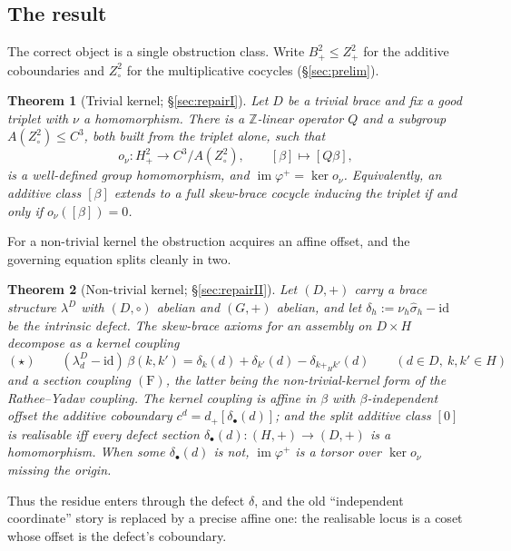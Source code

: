 \documentclass[11pt,reqno]{amsart}
\theoremstyle{plain}
\newtheorem{theorem}{Theorem}[section]
\theoremstyle{definition}
\newcommand{\Z}{\mathbb{Z}}
\newcommand{\id}{\mathrm{id}}
\newcommand{\im}{\operatorname{im}}
\newcommand{\shat}{\widehat{\sigma}}
\newcommand{\lD}{\lambda^{D}}
\begin{document}
\subsection*{The result}
The correct object is a single obstruction class. Write $B^2_+\le Z^2_+$ for the additive
coboundaries and $Z^2_\circ$ for the multiplicative cocycles (\S\ref{sec:prelim}).

\begin{theorem}[Trivial kernel; \S\ref{sec:repairI}]\label{thm:introA}
Let $D$ be a trivial brace and fix a good triplet with $\nu$ a homomorphism. There is a
$\Z$-linear operator $Q$ and a subgroup $A(Z^2_\circ)\le C^3$, both built from the triplet
alone, such that
\[
o_\nu\colon H^2_+\longrightarrow C^3/A(Z^2_\circ),\qquad [\beta]\mapsto[Q\beta],
\]
is a well-defined group homomorphism, and $\im\varphi^{+}=\ker o_\nu$. Equivalently, an
additive class $[\beta]$ extends to a full skew-brace cocycle inducing the triplet if and
only if $o_\nu([\beta])=0$.
\end{theorem}

For a non-trivial kernel the obstruction acquires an affine offset, and the governing
equation splits cleanly in two.

\begin{theorem}[Non-trivial kernel; \S\ref{sec:repairII}]\label{thm:introB}
Let $(D,+)$ carry a brace structure $\lD$ with $(D,\circ)$ abelian and $(G,+)$ abelian, and
let $\delta_h:=\nu_h\shat_h-\id$ be the intrinsic defect. The skew-brace axioms for an
assembly on $D\times H$ decompose as a \emph{kernel coupling}
\[
(\star)\qquad (\lD_d-\id)\,\beta(k,k')=\delta_k(d)+\delta_{k'}(d)-\delta_{k+_Hk'}(d)
\qquad(d\in D,\ k,k'\in H)
\]
and a \emph{section coupling} $\mathrm{(F)}$, the latter being the non-trivial-kernel form
of the Rathee--Yadav coupling. The kernel coupling is affine in $\beta$ with
$\beta$-independent offset the additive coboundary $c^d=d_+[\delta_\bullet(d)]$; and the
split additive class $[0]$ is realisable iff every defect section
$\delta_\bullet(d)\colon(H,+)\to(D,+)$ is a homomorphism. When some $\delta_\bullet(d)$ is
not, $\im\varphi^{+}$ is a torsor over $\ker o_\nu$ missing the origin.
\end{theorem}

Thus the residue enters through the defect $\delta$, and the old ``independent coordinate''
story is replaced by a precise affine one: the realisable locus is a coset whose offset is
the defect's coboundary.
\end{document}
